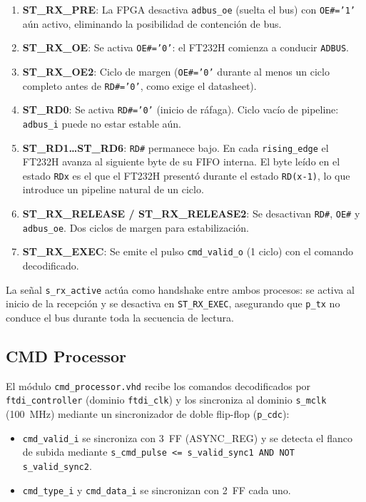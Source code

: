 \documentclass[../main.tex]{subfiles}
\begin{document}
\begin{enumerate}
    \item \textbf{ST\_RX\_PRE}: La FPGA desactiva \texttt{adbus\_oe} (suelta el bus) con \texttt{OE\#='1'} aún activo, eliminando la posibilidad de contención de bus.
    \item \textbf{ST\_RX\_OE}: Se activa \texttt{OE\#='0'}: el FT232H comienza a conducir \texttt{ADBUS}.
    \item \textbf{ST\_RX\_OE2}: Ciclo de margen (\texttt{OE\#='0'} durante al menos un ciclo completo antes de \texttt{RD\#='0'}, como exige el datasheet).
    \item \textbf{ST\_RD0}: Se activa \texttt{RD\#='0'} (inicio de ráfaga). Ciclo vacío de pipeline: \texttt{adbus\_i} puede no estar estable aún.
    \item \textbf{ST\_RD1\ldots ST\_RD6}: \texttt{RD\#} permanece bajo. En cada \texttt{rising\_edge} el FT232H avanza al siguiente byte de su FIFO interna. El byte leído en el estado \texttt{RDx} es el que el FT232H presentó durante el estado \texttt{RD(x-1)}, lo que introduce un pipeline natural de un ciclo.
    \item \textbf{ST\_RX\_RELEASE / ST\_RX\_RELEASE2}: Se desactivan \texttt{RD\#}, \texttt{OE\#} y \texttt{adbus\_oe}. Dos ciclos de margen para estabilización.
    \item \textbf{ST\_RX\_EXEC}: Se emite el pulso \texttt{cmd\_valid\_o} (1 ciclo) con el comando decodificado.
\end{enumerate}

La señal \texttt{s\_rx\_active} actúa como handshake entre ambos procesos: se activa al inicio de la recepción y se desactiva en \texttt{ST\_RX\_EXEC}, asegurando que \texttt{p\_tx} no conduce el bus durante toda la secuencia de lectura.

\subsection{CMD Processor}
\label{sec:cmd_processor}

El módulo \texttt{cmd\_processor.vhd} recibe los comandos decodificados por \texttt{ftdi\_controller} (dominio \texttt{ftdi\_clk}) y los sincroniza al dominio \texttt{s\_mclk} (100~MHz) mediante un sincronizador de doble flip-flop (\texttt{p\_cdc}):

\begin{itemize}
    \item \texttt{cmd\_valid\_i} se sincroniza con 3~FF (ASYNC\_REG) y se detecta el flanco de subida mediante \texttt{s\_cmd\_pulse <= s\_valid\_sync1 AND NOT s\_valid\_sync2}.
    \item \texttt{cmd\_type\_i} y \texttt{cmd\_data\_i} se sincronizan con 2~FF cada uno.
\end{itemize}
\end{document}
